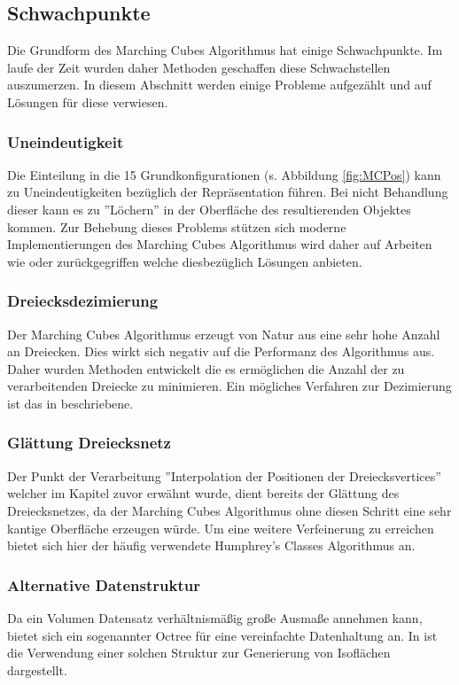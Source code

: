 \subsection{Schwachpunkte}
Die Grundform des Marching Cubes Algorithmus hat einige Schwachpunkte. Im laufe der Zeit wurden daher Methoden geschaffen diese Schwachstellen auszumerzen. In diesem Abschnitt werden einige Probleme aufgezählt und auf Lösungen für diese verwiesen.

\subsubsection{Uneindeutigkeit}
Die Einteilung in die 15 Grundkonfigurationen (s. Abbildung \ref{fig:MCPos}) kann zu Uneindeutigkeiten bezüglich der Repräsentation führen. Bei nicht Behandlung dieser kann es zu ''Löchern'' in der Oberfläche des resultierenden Objektes kommen. Zur Behebung dieses Problems stützen sich moderne Implementierungen des Marching Cubes Algorithmus wird daher auf Arbeiten wie \citep{Leak1} oder \citep{Leak2} zurückgegriffen welche diesbezüglich Lösungen anbieten.
\subsubsection{Dreiecksdezimierung}
Der Marching Cubes Algorithmus erzeugt von Natur aus eine sehr hohe Anzahl an Dreiecken. Dies wirkt sich negativ auf die Performanz des Algorithmus aus. Daher wurden Methoden entwickelt die es ermöglichen die Anzahl der zu verarbeitenden Dreiecke zu minimieren. Ein mögliches Verfahren zur Dezimierung ist das in \citep{DecTri} beschriebene.
\subsubsection{Glättung Dreiecksnetz}
Der Punkt der Verarbeitung ''Interpolation der Positionen der Dreiecksvertices'' welcher im Kapitel zuvor erwähnt wurde, dient bereits der Glättung des Dreiecksnetzes, da der Marching Cubes Algorithmus ohne diesen Schritt eine sehr kantige Oberfläche erzeugen würde. Um eine weitere Verfeinerung zu erreichen bietet sich hier der häufig verwendete Humphrey’s Classes Algorithmus \citep{Verf} an.
\subsubsection{Alternative Datenstruktur}
Da ein Volumen Datensatz verhältnismäßig große Ausmaße annehmen kann, bietet sich ein sogenannter Octree für eine vereinfachte Datenhaltung an. In \citep{Octree} ist die Verwendung einer solchen Struktur zur Generierung von Isoflächen dargestellt.

